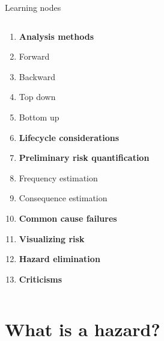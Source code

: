 \documentclass[aspectratio=1610,pdftex,dvipsnames,compress,xcolor={dvipsnames}]{beamer}
\begin{document}
\begin{frame}{Learning nodes}
\begin{columns}[t]
        \begin{column}{0.50\textwidth}
            \begin{enumerate}[series=outerlist,topsep=0pt,itemsep=1pt,leftmargin=*,label=(\arabic*)]
                \item[]\hfill\textbf{Analysis methods}
                \item[]\hfill Forward
                \item[]\hfill Backward
                \item[]\hfill Top down
                \item[]\hfill Bottom up
                    \vspace{0.10in}
                \item[]\hfill\textbf{Lifecycle considerations}
                    \vspace{0.10in}
                \item[]\hfill\textbf{Preliminary risk quantification}
                \item[]\hfill Frequency estimation
                \item[]\hfill Consequence estimation
                    \vspace{0.10in}
                \item[]\hfill\textbf{Common cause failures}
                    \vspace{0.05in}
                \item[]\hfill\textbf{Visualizing risk}
                    \vspace{0.05in}
                \item[]\hfill\textbf{Hazard elimination}
                    \vspace{0.05in}
                \item[]\hfill\textbf{Criticisms}
            \end{enumerate}
        \end{column}

    \end{columns}
\end{frame}


\section{What is a hazard?}
\end{document}

